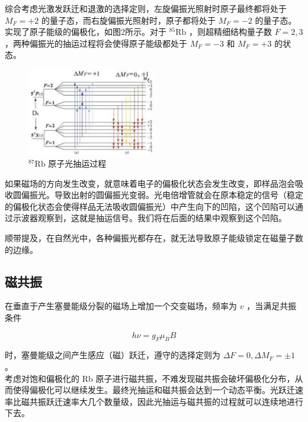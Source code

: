 \documentclass[10pt,hyperref,a4paper,UTF8]{ctexart}
\begin{document}
                综合考虑光激发跃迁和退激的选择定则，左旋偏振光照射时原子最终都将处于 $M_{F}=+2$ 的量子态，而右旋偏振光照射时，原子都将处于 $M_{F}=-2$ 的量子态。实现了原子能级的偏极化，如图2所示。对于 ${ }^{85} \mathrm{Rb}$ ，则超精细结构量子数 $F=2,3$ ，两种偏振光的抽运过程将会使得原子能级都处于 $M_{F}=-3$ 和 $M_{F}=+3$ 的状态。
                \begin{figure}[htbp]
                        \centering
                        \includegraphics[width=0.5\textwidth]{figures/2024_11_21_2f14a66c261050f0bd54g-04.jpg}
                        \caption{${ }^{87} \mathrm{Rb}$ 原子光抽运过程}
                \end{figure}

                如果磁场的方向发生改变，就意味着电子的偏极化状态会发生改变，即样品泡会吸收圆偏振光。导致出射的圆偏振光变弱。光电倍增管就会在原本稳定的信号（稳定的偏极化状态会使得样品无法吸收圆偏振光）中产生向下的凹陷，这个凹陷可以通过示波器观察到，这就是抽运信号。我们将在后面的结果中观察到这个凹陷。

                顺带提及，在自然光中，各种偏振光都存在，就无法导致原子能级锁定在磁量子数的边缘。

        \subsection{磁共振}
        在垂直于产生塞曼能级分裂的磁场上增加一个交变磁场，频率为 $v$ ，当满足共振条件

        \begin{equation}
        h \nu=g_{F} \mu_{B} B 
        \end{equation}
        
        时，塞曼能级之间产生感应（磁）跃迁，遵守的选择定则为 $\Delta F=0, \Delta M_{F}= \pm 1$ 。\\
        考虑对饱和偏极化的 Rb 原子进行磁共振，不难发现磁共振会破坏偏极化分布，从而使得偏极化可以继续发生。最终光抽运和磁共振会达到一个动态平衡。光跃迁速率比磁共振跃迁速率大几个数量级，因此光抽运与磁共振的过程就可以连续地进行下去。
        
\end{document}
